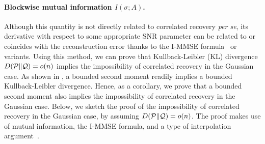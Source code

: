 







\paragraph{Blockwise mutual information $I(\sigma; A)$.}
Although this quantity is not directly related to correlated recovery \emph{per se}, its derivative with respect to some appropriate SNR parameter can be related to or coincides with the reconstruction error thanks to the I-MMSE formula~\cite{GuoShamaiVerdu05} or variants. 
Using this method, we can prove that Kullback-Leibler (KL) divergence $D (\mathcal{P} \| \mathcal{Q})=o(n)$ 
implies the impossibility of correlated recovery in the Gaussian case.  
As shown in , a bounded second moment readily implies a bounded Kullback-Leibler divergence.
Hence, as a corollary, we prove that a bounded second moment 
also implies the impossibility of correlated recovery in the Gaussian case.
Below, we sketch the proof of the impossibility of correlated recovery in the Gaussian case, by assuming $D (\mathcal{P} \| \mathcal{Q})=o(n)$. 
The proof makes use of mutual information, the I-MMSE formula, and a type of interpolation argument~\cite{MontanariPCA14,deshpande2015asymptotic,KrzakalaXuZdeborova16}. 


